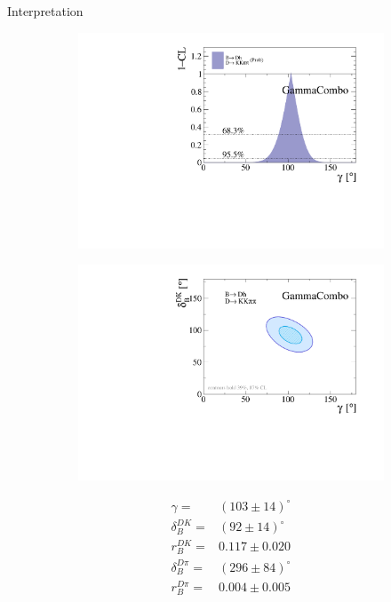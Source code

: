 \documentclass{beamer}
\begin{document}
\begin{frame}{Interpretation}
  \begin{figure}
    \centering
    \begin{subfigure}{0.50\textwidth}
      \includegraphics[width = 1.0\textwidth]{Plots/cartesian_KKpipi_GGSZ_gamma.pdf}
    \end{subfigure}%
    \begin{subfigure}{0.50\textwidth}
      \includegraphics[width = 1.0\textwidth]{Plots/cartesian_KKpipi_GGSZ_gamma_d_dk.pdf}
    \end{subfigure}
  \end{figure}
  \vspace{-0.75cm}
  \begin{align*}
    \gamma =& (103\pm14)^\circ \\
    \delta_B^{DK} =& (92\pm14)^\circ \\
    r_B^{DK} =& 0.117\pm0.020 \\
    \delta_B^{D\pi} =& (296\pm84)^\circ \\
    r_B^{D\pi} =& 0.004\pm0.005
  \end{align*}
\end{frame}
\end{document}
